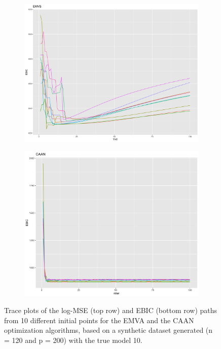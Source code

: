 \begin{figure}[tp]
\begin{subfigure}[b]{0.45\textwidth}
         \centering
         \includegraphics[width=\textwidth]{Figures/EMVS_EBIC.png}
     \end{subfigure}
     \hfill
     \begin{subfigure}[b]{0.45\textwidth}
         \centering
         \includegraphics[width=\textwidth]{Figures/CAAN_EBIC.png}
     \end{subfigure}
        \caption{Trace plots of the log-MSE (top row) and EBIC (bottom row) paths from 10 different initial points for the EMVA and the CAAN optimization algorithms, based on a synthetic dataset generated (n = 120 and p = 200) with the true model 10. }
        \label{fig:Opt_comparison}
\end{figure}
